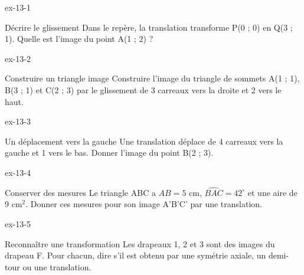 \clearpage{}
\begin{blocLivre}{ex-13-1}\begin{exercice}[1]{Décrire le glissement}
Dans le repère, la translation transforme P(0 ; 0) en Q(3 ; 1). Quelle est l’image du point A(1 ; 2) ?
\label{fig-ex-13-1}
\end{exercice}\end{blocLivre}
\begin{blocLivre}{ex-13-2}\begin{exercice}[1]{Construire un triangle image}
Construire l’image du triangle de sommets A(1 ; 1), B(3 ; 1) et C(2 ; 3) par le glissement de 3 carreaux vers la droite et 2 vers le haut.
\label{fig-ex-13-2}
\end{exercice}\end{blocLivre}
\begin{blocLivre}{ex-13-3}\begin{exercice}[1]{Un déplacement vers la gauche}
Une translation déplace de 4 carreaux vers la gauche et 1 vers le bas. Donner l’image du point B(2 ; 3).
\label{fig-ex-13-3}
\end{exercice}\end{blocLivre}
\begin{blocLivre}{ex-13-4}\begin{exercice}[1]{Conserver des mesures}
Le triangle ABC a $AB=5$ cm, $\widehat{BAC}=42^\circ$ et une aire de 9 cm$^2$. Donner ces mesures pour son image A’B’C’ par une translation.
\label{fig-ex-13-4}
\end{exercice}\end{blocLivre}
\begin{blocLivre}{ex-13-5}\begin{exercice}[1]{Reconnaître une transformation}
Les drapeaux 1, 2 et 3 sont des images du drapeau F. Pour chacun, dire s’il est obtenu par une symétrie axiale, un demi-tour ou une translation.
\label{fig-ex-13-5}
\end{exercice}\end{blocLivre}

